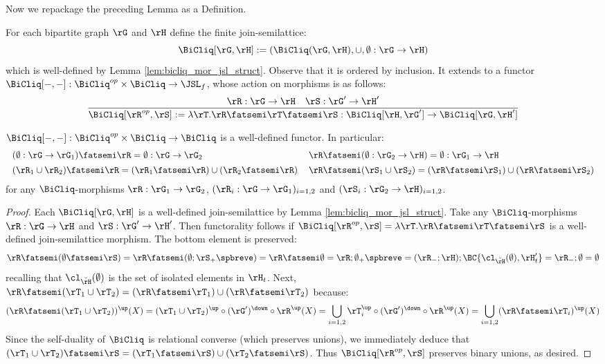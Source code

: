 \documentclass{article}
\begin{document}
Now we repackage the preceding Lemma as a Definition.

\begin{definition}
\label{def:bicliq_hom_functor_jsl}
\item
For each bipartite graph $\rG$ and $\rH$ define the finite join-semilattice:
\[
\BiCliq[\rG,\rH] := (\BiCliq(\rG,\rH),\cup,\emptyset : \rG \to \rH ) 
\]
which is well-defined by Lemma \ref{lem:bicliq_mor_jsl_struct}. Observe that it is ordered by inclusion. It extends to a functor $\BiCliq[-,-] : \BiCliq^{op} \times \BiCliq \to \JSL_f$, whose action on morphisms is as follows:
\[
\dfrac{\rR : \rG \to \rH \quad \rS : \rG' \to \rH'}
{\BiCliq[\rR^{op},\rS] := \lambda \rT. \rR \fatsemi \rT \fatsemi \rS : \BiCliq[\rH,\rG'] \to \BiCliq[\rG,\rH']}
\]
\endbox
\end{definition}

\begin{lemma}
\label{lem:bicliq_hom_functor}
$\BiCliq[-,-] : \BiCliq^{op} \times \BiCliq \to \BiCliq$ is a well-defined functor. In particular:
\[
\begin{tabular}{ll}
$(\emptyset : \rG \to \rG_1) \fatsemi \rR = \emptyset : \rG \to \rG_2$
&
$\rR \fatsemi (\emptyset : \rG_2 \to \rH) = \emptyset : \rG_1 \to \rH$
\\[1ex]
$(\rR_1 \cup \rR_2) \fatsemi \rR = (\rR_1 \fatsemi \rR) \cup (\rR_2 \fatsemi \rR)$
&
$\rR \fatsemi (\rS_1 \cup \rS_2) = (\rR \fatsemi \rS_1) \cup (\rR \fatsemi \rS_2)$
\end{tabular}
\]
for any $\BiCliq$-morphisms $\rR : \rG_1 \to \rG_2$, $(\rR_i : \rG \to \rG_1)_{i = 1,2}$ and $(\rS_i : \rG_2 \to \rH)_{i = 1,2}$.
\end{lemma}

\begin{proof}
Each $\BiCliq[\rG,\rH]$ is a well-defined join-semilattice by Lemma \ref{lem:bicliq_mor_jsl_struct}. Take any $\BiCliq$-morphisms $\rR : \rG \to \rH$ and $\rS : \rG' \to \rH'$. Then functorality follows if $\BiCliq[\rR^{op},\rS] = \lambda \rT. \rR \fatsemi \rT \fatsemi \rS$ is a well-defined join-semilattice morphism. The bottom element is preserved:
\[
\rR \fatsemi (\emptyset \fatsemi \rS)
= \rR \fatsemi (\emptyset ; \rS_+\spbreve)
= \rR \fatsemi \emptyset
= \rR ; \emptyset_+\spbreve
= (\rR_- ; \rH) ; \BC{\cl_{\breve{\rH}}(\emptyset),\rH'_t}
= \rR_- ; \emptyset
= \emptyset
\]
recalling that $\cl_{\breve{\rH}}(\emptyset)$ is the set of isolated elements in $\rH_t$. Next, $\rR \fatsemi (\rT_1 \cup \rT_2) = (\rR \fatsemi \rT_1) \cup (\rR \fatsemi \rT_2)$ because:
\[
(\rR \fatsemi (\rT_1 \cup \rT_2))^\up(X)
= (\rT_1 \cup \rT_2)^\up \circ (\rG')^\down \circ \rR^\up(X)
= \bigcup_{i = 1,2} \rT_i^\up \circ (\rG')^\down \circ \rR^\up(X)
= \bigcup_{i = 1,2} (\rR \fatsemi \rT_i)^\up (X)
\]
Since the self-duality of $\BiCliq$ is relational converse (which preserves unions), we immediately deduce that $(\rT_1 \cup \rT_2) \fatsemi \rS = (\rT_1 \fatsemi \rS) \cup (\rT_2 \fatsemi \rS)$. Thus $\BiCliq[\rR^{op},\rS]$ preserves binary unions, as desired.
\end{proof}
\end{document}

